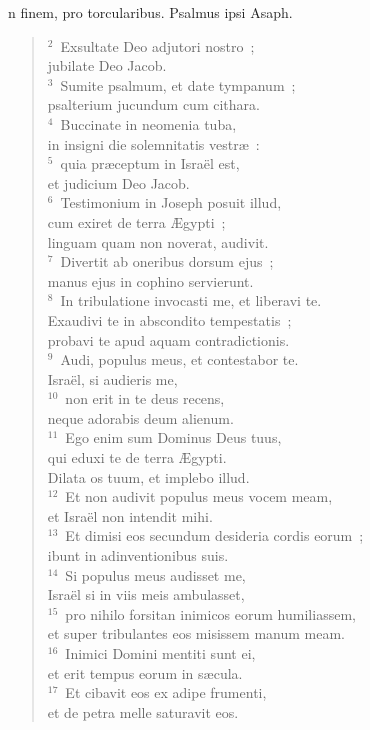 \bchapter
{}n finem, pro torcularibus. Psalmus ipsi Asaph.
\begin{flushleft}\begin{verse}\vspace{6pt}${}^{2}$~Exsultate Deo adjutori nostro~;\\ jubilate Deo Jacob.\\
${}^{3}$~Sumite psalmum, et date tympanum~;\\ psalterium jucundum cum cithara.\\
${}^{4}$~Buccinate in neomenia tuba,\\ in insigni die solemnitatis vestr\ae~:\\
${}^{5}$~quia pr\ae ceptum in Isra\"el est,\\ et judicium Deo Jacob.\\
${}^{6}$~Testimonium in Joseph posuit illud,\\ cum exiret de terra \AE gypti~;\\ linguam quam non noverat, audivit.\\
${}^{7}$~Divertit ab oneribus dorsum ejus~;\\ manus ejus in cophino servierunt.\\
${}^{8}$~In tribulatione invocasti me, et liberavi te.\\ Exaudivi te in abscondito tempestatis~;\\ probavi te apud aquam contradictionis.\\
${}^{9}$~Audi, populus meus, et contestabor te.\\ Isra\"el, si audieris me,\\
${}^{10}$~non erit in te deus recens,\\ neque adorabis deum alienum.\\
${}^{11}$~Ego enim sum Dominus Deus tuus,\\ qui eduxi te de terra \AE gypti.\\ Dilata os tuum, et implebo illud.\\
${}^{12}$~Et non audivit populus meus vocem meam,\\ et Isra\"el non intendit mihi.\\
${}^{13}$~Et dimisi eos secundum desideria cordis eorum~;\\ ibunt in adinventionibus suis.\\
${}^{14}$~Si populus meus audisset me,\\ Isra\"el si in viis meis ambulasset,\\
${}^{15}$~pro nihilo forsitan inimicos eorum humiliassem,\\ et super tribulantes eos misissem manum meam.\\
${}^{16}$~Inimici Domini mentiti sunt ei,\\ et erit tempus eorum in s\ae cula.\\
${}^{17}$~Et cibavit eos ex adipe frumenti,\\ et de petra melle saturavit eos.\end{verse}\end{flushleft}



